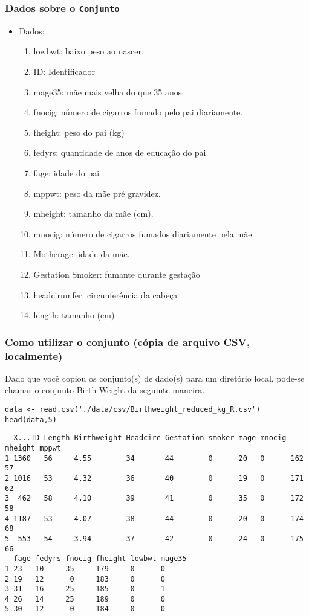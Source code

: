 \documentclass[11pt]{article}
\begin{document}
\subsubsection{Dados sobre o \texttt{Conjunto}}
\label{sec:orgcf4100b}
\begin{itemize}
\item Dados:
\begin{enumerate}
\item lowbwt: baixo peso ao nascer.
\item ID: Identificador
\item mage35: mãe mais velha do que 35 anos.
\item fnocig: número de cigarros fumado pelo pai diariamente.
\item fheight: peso do pai (kg)
\item fedyrs: quantidade de anos de educação do pai
\item fage: idade do pai
\item mppwt: peso da mãe pré gravidez.
\item mheight: tamanho da mãe (cm).
\item mnocig: número de cigarros fumados diariamente pela mãe.
\item Motherage: idade da mãe.
\item Gestation Smoker: fumante durante gestação
\item headcirumfer: circunferência da cabeça
\item length: tamanho (cm)
\end{enumerate}
\end{itemize}
\subsubsection{Como utilizar o conjunto (cópia de arquivo CSV, localmente)}
\label{sec:org11d7f65}

Dado que você copiou os conjunto(s) de dado(s) para um diretório
local, pode-se chamar o conjunto \href{https://drive.google.com/file/d/1xv2lCPsj04FjGPQ\_BgPS9mrTIjBcyHQk/view?usp=sharing}{Birth Weight} da seguinte maneira.

\begin{verbatim}
data <- read.csv('./data/csv/Birthweight_reduced_kg_R.csv')
head(data,5)
\end{verbatim}

\begin{verbatim}
  X...ID Length Birthweight Headcirc Gestation smoker mage mnocig mheight mppwt
1 1360   56     4.55        34       44        0      20   0      162     57   
2 1016   53     4.32        36       40        0      19   0      171     62   
3  462   58     4.10        39       41        0      35   0      172     58   
4 1187   53     4.07        38       44        0      20   0      174     68   
5  553   54     3.94        37       42        0      24   0      175     66   
  fage fedyrs fnocig fheight lowbwt mage35
1 23   10     35     179     0      0     
2 19   12      0     183     0      0     
3 31   16     25     185     0      1     
4 26   14     25     189     0      0     
5 30   12      0     184     0      0     
\end{verbatim}
\clearpage
\end{document}
